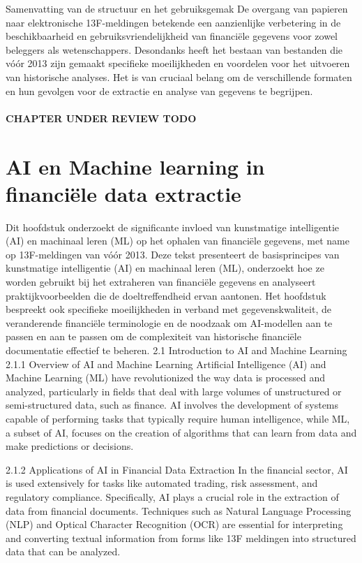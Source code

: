 Samenvatting van de structuur en het gebruiksgemak
De overgang van papieren naar elektronische 13F-meldingen betekende een aanzienlijke verbetering in de beschikbaarheid en gebruiksvriendelijkheid van financiële gegevens voor zowel beleggers als wetenschappers. Desondanks heeft het bestaan van bestanden die vóór 2013 zijn gemaakt specifieke moeilijkheden en voordelen voor het uitvoeren van historische analyses. Het is van cruciaal belang om de verschillende formaten en hun gevolgen voor de extractie en analyse van gegevens te begrijpen.



\paragraph{CHAPTER UNDER REVIEW TODO}
    
\section{AI en Machine learning in financiële data extractie}

Dit hoofdstuk onderzoekt de significante invloed van kunstmatige intelligentie (AI) en machinaal leren (ML) op het ophalen van financiële gegevens, met name op 13F-meldingen van vóór 2013. Deze tekst presenteert de basisprincipes van kunstmatige intelligentie (AI) en machinaal leren (ML), onderzoekt hoe ze worden gebruikt bij het extraheren van financiële gegevens en analyseert praktijkvoorbeelden die de doeltreffendheid ervan aantonen. Het hoofdstuk bespreekt ook specifieke moeilijkheden in verband met gegevenskwaliteit, de veranderende financiële terminologie en de noodzaak om AI-modellen aan te passen en aan te passen om de complexiteit van historische financiële documentatie effectief te beheren.
2.1 Introduction to AI and Machine Learning
2.1.1 Overview of AI and Machine Learning
Artificial Intelligence (AI) and Machine Learning (ML) have revolutionized the way data is processed and analyzed, particularly in fields that deal with large volumes of unstructured or semi-structured data, such as finance. AI involves the development of systems capable of performing tasks that typically require human intelligence, while ML, a subset of AI, focuses on the creation of algorithms that can learn from data and make predictions or decisions.

2.1.2 Applications of AI in Financial Data Extraction
In the financial sector, AI is used extensively for tasks like automated trading, risk assessment, and regulatory compliance. Specifically, AI plays a crucial role in the extraction of data from financial documents. Techniques such as Natural Language Processing (NLP) and Optical Character Recognition (OCR) are essential for interpreting and converting textual information from forms like 13F meldingen into structured data that can be analyzed.

